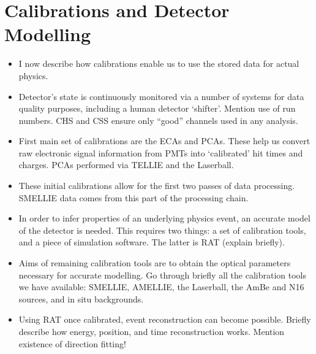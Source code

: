 \section{Calibrations and Detector Modelling}
\begin{itemize}
    \item I now describe how calibrations enable us to use the stored data for actual physics.
    \item Detector's state is continuously monitored via a number of systems for data quality purposes, including a human detector `shifter'. Mention use of run numbers. CHS and CSS ensure only ``good'' channels used in any analysis.
    \item First main set of calibrations are the ECAs and PCAs. These help us convert raw electronic signal information from PMTs into `calibrated' hit times and charges. PCAs performed via TELLIE and the Laserball.
    \item These initial calibrations allow for the first two passes of data processing. SMELLIE data comes from this part of the processing chain.
    \item In order to infer properties of an underlying physics event, an accurate model of the detector is needed. This requires two things: a set of calibration tools, and a piece of simulation software. The latter is RAT (explain briefly).
    \item Aims of remaining calibration tools are to obtain the optical parameters necessary for accurate modelling. Go through briefly all the calibration tools we have available: SMELLIE, AMELLIE, the Laserball, the AmBe and N16 sources, and in situ backgrounds.
    \item Using RAT once calibrated, event reconstruction can become possible. Briefly describe how energy, position, and time reconstruction works. Mention existence of direction fitting!
\end{itemize}